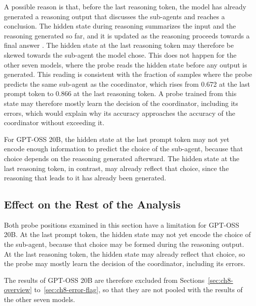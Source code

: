 A possible reason is that, before the last reasoning token, the model has already generated a reasoning output that discusses the sub-agents and reaches a conclusion. The hidden state during reasoning summarizes the input and the reasoning generated so far, and it is updated as the reasoning proceeds towards a final answer \cite{luStreamingHallucinationDetection2026}. The hidden state at the last reasoning token may therefore be skewed towards the sub-agent the model chose. This does not happen for the other seven models, where the probe reads the hidden state before any output is generated. This reading is consistent with the fraction of samples where the probe predicts the same sub-agent as the coordinator, which rises from 0.672 at the last prompt token to 0.866 at the last reasoning token. A probe trained from this state may therefore mostly learn the decision of the coordinator, including its errors, which would explain why its accuracy approaches the accuracy of the coordinator without exceeding it.

For GPT-OSS 20B, the hidden state at the last prompt token may not yet encode enough information to predict the choice of the sub-agent, because that choice depends on the reasoning generated afterward. The hidden state at the last reasoning token, in contrast, may already reflect that choice, since the reasoning that leads to it has already been generated.

\subsection{Effect on the Rest of the Analysis}
\label{subsec:ch8-gpt-oss-exclusion}

Both probe positions examined in this section have a limitation for GPT-OSS 20B. At the last prompt token, the hidden state may not yet encode the choice of the sub-agent, because that choice may be formed during the reasoning output. At the last reasoning token, the hidden state may already reflect that choice, so the probe may mostly learn the decision of the coordinator, including its errors.

The results of GPT-OSS 20B are therefore excluded from Sections~\ref{sec:ch8-overview} to~\ref{sec:ch8-error-flag}, so that they are not pooled with the results of the other seven models.

\FloatBarrier
